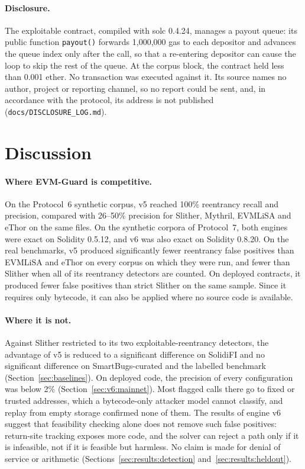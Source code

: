 \documentclass[pdflatex,sn-mathphys]{sn-jnl}
\theoremstyle{thmstyletwo}
\theoremstyle{thmstyletwo}
\begin{document}
\paragraph{Disclosure.} The exploitable contract, compiled with solc 0.4.24, manages a payout queue: its public function \texttt{payout()} forwards 1,000,000 gas to each depositor and advances the queue index only after the call, so that a re-entering depositor can cause the loop to skip the rest of the queue. At the corpus block, the contract held less than 0.001 ether. No transaction was executed against it. Its source names no author, project or reporting channel, so no report could be sent, and, in accordance with the protocol, its address is not published (\texttt{docs/DISCLOSURE\_LOG.md}).

\section{Discussion}\label{sec:disc}

\paragraph{Where EVM-Guard is competitive.} On the Protocol~6 synthetic corpus, v5 reached 100\% reentrancy recall and precision, compared with 26--50\% precision for Slither, Mythril, EVMLiSA and eThor on the same files. On the synthetic corpora of Protocol~7, both engines were exact on Solidity 0.5.12, and v6 was also exact on Solidity 0.8.20. On the real benchmarks, v5 produced significantly fewer reentrancy false positives than EVMLiSA and eThor on every corpus on which they were run, and fewer than Slither when all of its reentrancy detectors are counted. On deployed contracts, it produced fewer false positives than strict Slither on the same sample. Since it requires only bytecode, it can also be applied where no source code is available.

\paragraph{Where it is not.} Against Slither restricted to its two exploitable-reentrancy detectors, the advantage of v5 is reduced to a significant difference on SolidiFI and no significant difference on SmartBugs-curated and the labelled benchmark (Section~\ref{sec:baselines}). On deployed code, the precision of every configuration was below 2\% (Section~\ref{sec:v6:mainnet}). Most flagged calls there go to fixed or trusted addresses, which a bytecode-only attacker model cannot classify, and replay from empty storage confirmed none of them. The results of engine v6 suggest that feasibility checking alone does not remove such false positives: return-site tracking exposes more code, and the solver can reject a path only if it is infeasible, not if it is feasible but harmless. No claim is made for denial of service or arithmetic (Sections~\ref{sec:results:detection} and~\ref{sec:results:heldout}).
\end{document}
